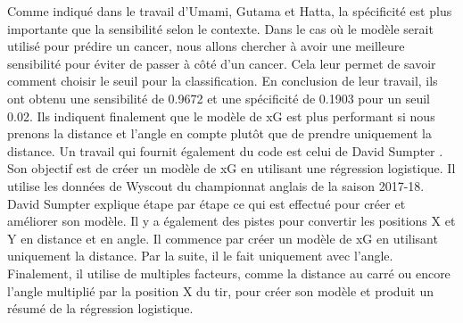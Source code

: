 \documentclass[12pt]{article}
\begin{document}
Comme indiqué dans le travail d'Umami, Gutama et Hatta, la spécificité est plus importante que la sensibilité selon le contexte.
Dans le cas où le modèle serait utilisé pour prédire un cancer, nous allons chercher à avoir une meilleure sensibilité pour éviter de passer à côté d'un cancer. \cite{umamiImplementingExpectedGoal2021}
Cela leur permet de savoir comment choisir le seuil pour la classification.
En conclusion de leur travail, ils ont obtenu une sensibilité de 0.9672 et une spécificité de 0.1903 pour un seuil 0.02.
Ils indiquent finalement que le modèle de xG est plus performant si nous prenons la distance et l'angle en compte plutôt que de prendre uniquement la distance.
\newline\newline
Un travail qui fournit également du code est celui de David Sumpter \cite{sumpterFittingXGModel}. 
Son objectif est de créer un modèle de xG en utilisant une régression logistique. 
Il utilise les données de Wyscout du championnat anglais de la saison 2017-18. 
David Sumpter explique étape par étape ce qui est effectué pour créer et améliorer son modèle.
Il y a également des pistes pour convertir les positions X et Y en distance et en angle.
Il commence par créer un modèle de xG en utilisant uniquement la distance. 
Par la suite, il le fait uniquement avec l'angle.
Finalement, il utilise de multiples facteurs, comme la distance au carré ou encore l'angle multiplié par la position X du tir, pour créer son modèle et produit un résumé de la régression logistique.
\end{document}
